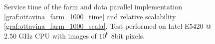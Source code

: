 \begin{figure}[p]
\centering
{}
\caption{ Service time of the farm and data parallel implementation \ref{graf:ottavina_farm_1000_time} and relative scalability \ref{graf:ottavina_farm_1000_scala}. Test performed on Intel E5420 @ 2.50 GHz CPU with images of $10^6$ 8bit pixels.}
\label{chart:ottavina_data_1000}
\end{figure}

